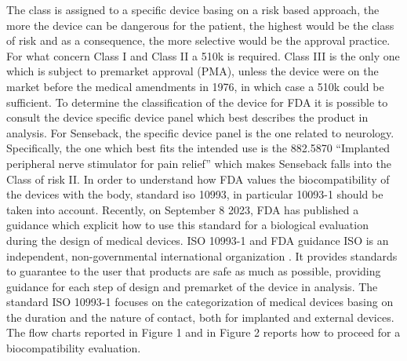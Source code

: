 \documentclass{Configuration_Files/PoliMi3i_thesis}
\begin{document}
The class is assigned to a specific device basing on a risk based approach, the more the device can be dangerous for the patient, the highest would be the class of risk and as a consequence, the more selective would be the approval practice. For what concern Class I and Class II a 510k is required. Class III is the only one which is subject to premarket approval (PMA), unless the device were on the market before the medical amendments in 1976, in which case a 510k could be sufficient.
To determine the classification of the device for FDA it is possible to consult the device specific device panel \cite{healthDeviceClassificationPanels2023} which best describes the product in analysis. For Senseback, the specific device panel is the one related to neurology. Specifically, the one which best fits the intended use is the 882.5870 “Implanted peripheral nerve stimulator for pain relief” \cite{CFRCodeFederal} which makes Senseback falls into the Class of risk II.
In order to understand how FDA values the biocompatibility of the devices with the body, standard iso 10993, in particular 10093-1 \cite{14:00-17:00ISO1099312018a} should be taken into account. Recently, on September 8 2023, FDA has published a guidance \cite{healthUseInternationalStandard2023} which explicit how to use this standard for a biological evaluation during the design of medical devices. 
ISO 10993-1 and FDA guidance
ISO is an independent, non-governmental international organization \cite{ISOInternationalOrganization}. It provides standards to guarantee to the user that products are safe as much as possible, providing guidance for each step of design and premarket of the device in analysis.
The standard ISO 10993-1 focuses on the categorization of medical devices basing on the duration and the nature of contact, both for implanted and external devices.
The flow charts reported in Figure 1 and in Figure 2 reports how to proceed for a biocompatibility evaluation.
\end{document}
